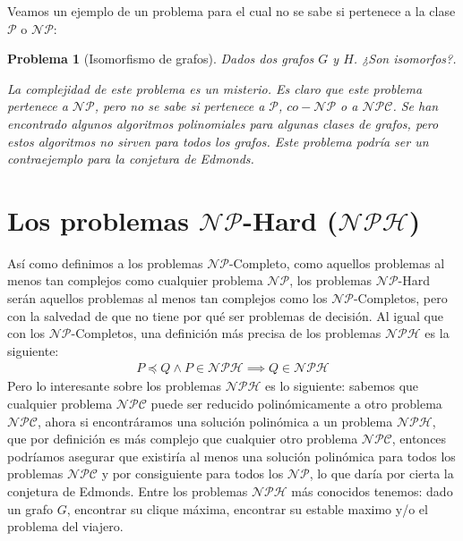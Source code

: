 \documentclass{article}
\newtheorem{problem}{Problema}
\begin{document}
Veamos un ejemplo de un problema para el cual no se sabe si
pertenece a la clase $\mathcal{P}$ o $\mathcal{NP}$:

\begin{problem}[Isomorfismo de grafos]
Dados dos grafos $G$ y $H$. ¿Son isomorfos?.

La complejidad de este problema es un misterio. Es claro que
este problema pertenece a $\mathcal{NP}$, pero no se sabe
si pertenece a $\mathcal{P}$, $co-\mathcal{NP}$ o a $\mathcal{NPC}$.
Se han encontrado algunos algoritmos polinomiales para algunas
clases de grafos, pero estos algoritmos no sirven para todos
los grafos. Este problema podría ser un contraejemplo para
la conjetura de Edmonds.
\end{problem}

\section*{Los problemas $\mathcal{NP}$-Hard ($\mathcal{NPH}$)}
Así como definimos a los problemas $\mathcal{NP}$-Completo, como aquellos problemas al menos tan complejos como cualquier problema $\mathcal{NP}$, los problemas $\mathcal{NP}$-Hard serán aquellos problemas al menos tan complejos como los $\mathcal{NP}$-Completos, pero con la salvedad de que no tiene por qué ser problemas de decisión.
Al igual que con los $\mathcal{NP}$-Completos, una definición más precisa de los problemas $\mathcal{NPH}$ es la siguiente:
\begin{align*}
    P \preceq Q \land P \in \mathcal{NPH} \implies Q\in   \mathcal{NPH}
\end{align*}
Pero lo interesante sobre los problemas $\mathcal{NPH}$ es lo siguiente: sabemos que cualquier problema $\mathcal{NPC}$ puede ser reducido polinómicamente a otro problema $\mathcal{NPC}$, ahora si encontráramos una solución polinómica a un problema $\mathcal{NPH}$, que por definición es más complejo que cualquier otro problema $\mathcal{NPC}$, entonces podríamos asegurar que existiría al menos una solución polinómica para todos los problemas $\mathcal{NPC}$ y por consiguiente para todos los $\mathcal{NP}$, lo que daría por cierta la conjetura de Edmonds.\newline
Entre los problemas $\mathcal{NPH}$ más conocidos tenemos: dado un grafo $G$, encontrar su clique máxima, encontrar su estable maximo y/o el problema del viajero.
\end{document}
